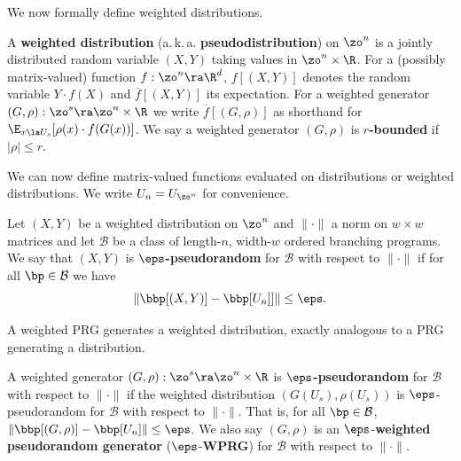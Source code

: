 We now formally %
define  %
weighted distributions.
\begin{definition}
A \textbf{weighted distribution} %
(a.\,k.\,a.  %
\textbf{pseudodistribution}) on $\zo^n$ is a jointly distributed random variable $(X,Y)$ taking values in $\zo^n\times \R$. For a (possibly %
matrix-valued) %
function $f:\zo^n\ra\R^d$, $f[(X,Y)]$ denotes the random variable $Y\cdot f(X)$ and $\overline{f}[(X,Y)]$ its expectation. For a weighted generator $(G,\rho):\zo^s\ra \zo^n\times \R$ we write $\overline{f}[(G,\rho)]$ as shorthand for $\E_{x\la U_s}[\rho(x)\cdot f(G(x))]$. We say a weighted generator $(G,\rho)$ is \textbf{$r$-bounded} if $|\rho|\leq r$.
\end{definition}
We can now define %
matrix-valued %
functions evaluated on distributions or weighted distributions. We write $U_n=U_{\zo^n}$ for convenience.
\begin{definition}
    Let $(X,Y)$ be a weighted distribution on $\zo^n$ and $\|\cdot\|$ a norm on $w\times w$ matrices and let $\mathcal{B}$ be a class of %
    length-$n$, width-$w$ %
    ordered branching programs. We say that $(X,Y)$ is \textbf{$\eps$-pseudorandom} for $\mathcal{B}$  with respect to $\|\cdot\|$  if for all $\bp \in \mathcal{B}$ we have
    $$\left\| \bbp[(X,Y)] - \bbp[U_n]]\right\|\leq \eps.$$
\end{definition}
A weighted PRG generates a weighted distribution, exactly analogous to a PRG generating a distribution.
\begin{definition}
A weighted generator $(G,\rho):\zo^s\ra\zo^n\times\R$ is \textbf{$\eps$-pseudorandom} for $\mathcal{B}$ with respect to $\|\cdot\|$ if the weighted distribution $(G(U_s),\rho(U_s))$ is $\eps$-pseudorandom for $\mathcal{B}$ with respect to $\|\cdot\|$. That is, for all $\bp\in \mathcal{B}$, $\|\bbp[(G,\rho)]-\bbp[U_n]\|\leq \eps$. We also say $(G,\rho)$ is an $\eps$-\textbf{weighted pseudorandom generator} ($\eps$-\textbf{WPRG}) for $\mathcal{B}$ with respect to $\|\cdot\|$.
\end{definition}

